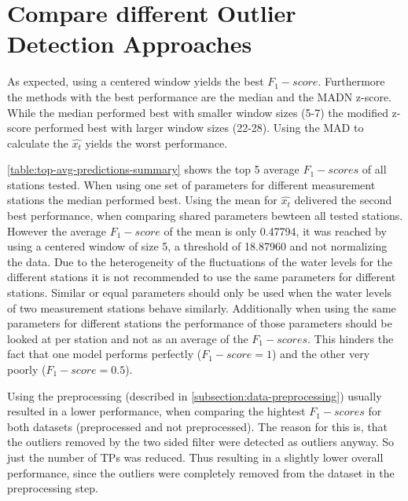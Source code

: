 \section{Compare different Outlier Detection Approaches}
As expected, using a centered window yields the best $F_1-score$. Furthermore the methods with the best performance are the median and the \ac{MADN} z-score. While the median performed best with smaller window sizes (5-7) the modified z-score performed best with larger window sizes (22-28). Using the \ac{MAD} to calculate the $\hat{x_t}$ yields the worst performance.
\par
\autoref{table:top-avg-predictions-summary} shows the top 5 average $F_1-scores$ of all stations tested. When using one set of parameters for different measurement stations the median performed best. Using the mean for $\hat{x_t}$ delivered the second best performance, when comparing shared parameters bewteen all tested stations. However the average $F_1-score$ of the mean is only 0.47794, it was reached by using a centered window of size 5, a threshold of 18.87960 and not normalizing the data. Due to the heterogeneity of the fluctuations of the water levels for the different stations it is not recommended to use the same parameters for different stations. Similar or equal parameters should only be used when the water levels of two measurement stations behave similarly. Additionally when using the same parameters for different stations the performance of those parameters should be looked at per station and not as an average of the  $F_1-scores$. This hinders the fact that one model performs perfectly ($F_1-score = 1$) and the other very poorly ($F_1-score = 0.5$). 

\par
Using the preprocessing (described in \autoref{subsection:data-preprocessing}) usually resulted in a lower performance, when comparing the hightest $F_1-scores$ for both datasets (preprocessed and not preprocessed). The reason for this is, that the outliers removed by the two sided filter were detected as outliers anyway. So just the number of \acp{TP} was reduced. Thus resulting in a slightly lower overall performance, since the outliers were completely removed from the dataset in the preprocessing step.

